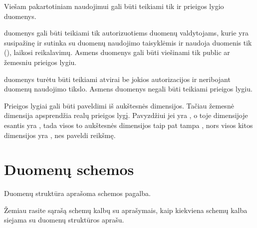 \documentclass[letterpaper,10pt,lithuanian]{sphinxmanual}
\begin{document}
\sphinxAtStartPar
Viešam pakartotiniam naudojimui gali būti teikiami tik  ir 
prieigos lygio duomenys.

\sphinxAtStartPar
{} duomenys gali būti teikiami tik autorizuotiems duomenų valdytojams,
kurie yra susipažinę ir sutinka su duomenų naudojimo taisyklėmis ir naudoja
duomenis tik  (), laikosi 
reikalavimų.
Asmens duomenys gali būti viešinami tik public ar žemesniu prieigos lygiu.

\sphinxAtStartPar
{} duomenys turėtu būti teikiami atvirai be jokios autorizacijos ir
neribojant duomenų naudojimo tikslo. Asmens duomenys negali būti teikiami 
prieigos lygiu.

\sphinxAtStartPar
Prieigos lygiai gali būti paveldimi iš aukštesnės dimensijos. Tačiau žemesnė
dimensija apsprendžia realų prieigos lygį. Pavyzdžiui jei {\hyperref[\detokenize{dimensijos:dataset.access}]{}}
yra , o toje {\hyperref[\detokenize{formatas:dataset}]{}} dimensijoje esantis {\hyperref[\detokenize{formatas:property}]{}} yra
, tada visos to {\hyperref[\detokenize{formatas:property}]{}} aukštesnės dimensijos taip pat tampa
, nors visos kitos dimensijos yra , nes paveldi
{\hyperref[\detokenize{dimensijos:dataset.access}]{}} reikšmę.

\sphinxstepscope


\section{Duomenų schemos}
\label{\detokenize{schemos/index:duomenu-schemos}}\label{\detokenize{schemos/index::doc}}
\sphinxAtStartPar
Duomenų struktūra aprašoma schemos pagalba.

\sphinxAtStartPar
Žemiau rasite sąrašą schemų kalbų su aprašymais, kaip kiekviena schemų kalba
siejama su duomenų struktūros aprašu.
\end{document}
